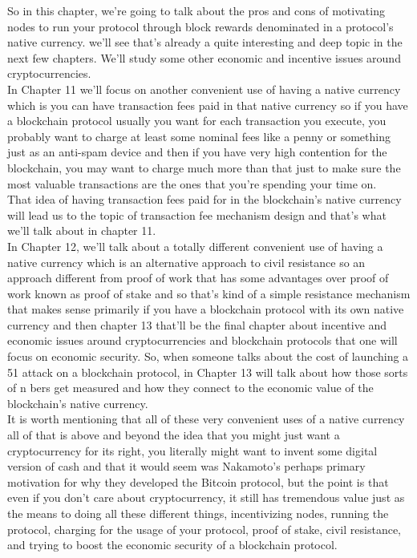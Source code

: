 So in this chapter, we're going to talk about the pros and cons of
motivating nodes to run your protocol
through block rewards denominated in a
protocol's native currency. we'll see
that's already a quite interesting
and deep topic in the next few chapters.
We'll study some other economic and
incentive issues around cryptocurrencies.\\

In Chapter 11 we'll focus on another
convenient use of having a native
currency which is you can have
transaction fees paid in that native
currency so if you have a
blockchain protocol usually you want for
each transaction you execute, you
probably want to charge at least some
nominal fees like a penny or something
just as an anti-spam device and then if
you have very high contention
for the blockchain, you may want to
charge much more than that just to make
sure the most valuable transactions are
the ones that you're spending your time on.\\
That idea of having transaction fees
paid for in the blockchain's
native currency will lead us to the
topic of transaction fee mechanism
design and that's what we'll talk about
in chapter 11.\\

In Chapter 12, we'll talk about a totally
different convenient use
of having a native currency which is an
alternative approach to civil resistance
so an approach different from proof of
work that has some advantages over
proof of work known as proof of stake
and so that's kind of a simple
resistance mechanism that makes sense
primarily if you have a blockchain
protocol with its own
native currency
and then chapter 13 that'll be the final
chapter about
incentive and economic issues
around cryptocurrencies and blockchain
protocols that one will focus on
economic security. So, when someone
talks about the cost of launching a 51 attack on a
blockchain protocol, in
Chapter 13 will talk about how those sorts of
n bers get measured and how they
connect to the economic value of the
blockchain's native currency.\\

It is worth mentioning that all of these very
convenient uses of a native currency all
of that is above and beyond the
idea that you might just want a
cryptocurrency for its right, you
literally might want to invent
some digital version of cash and that
it would seem was Nakamoto's
perhaps primary
motivation for why they developed the
Bitcoin protocol, but the point is
that even if you don't care
about cryptocurrency,
it still has tremendous value just as
the means to doing all these
different things, incentivizing nodes,
running the protocol, charging for the
usage of your protocol, proof of stake,
civil resistance, and trying to boost the
economic security of a blockchain
protocol.


